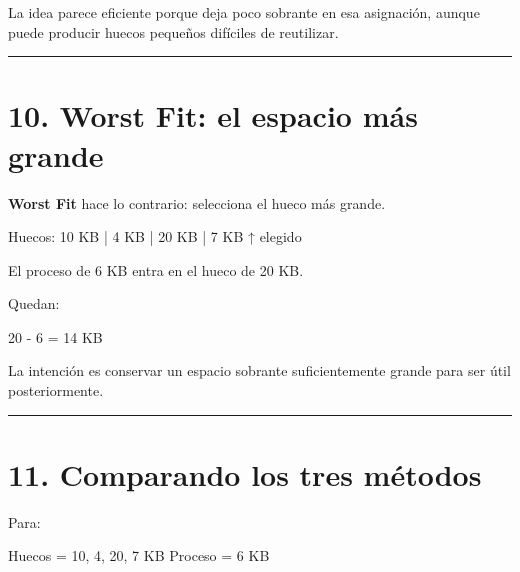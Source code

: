 \documentclass[
  spanish,
  letterpaper,
]{scrbook}
\newenvironment{Shaded}{\begin{snugshade}}{\end{snugshade}}
\newcommand{\NormalTok}[1]{\textcolor[rgb]{0.00,0.23,0.31}{#1}}
\begin{document}
La idea parece eficiente porque deja poco sobrante en esa asignación,
aunque puede producir huecos pequeños difíciles de reutilizar.

\begin{center}\rule{0.5\linewidth}{0.5pt}\end{center}


\chapter{10. Worst Fit: el espacio más
grande}\label{worst-fit-el-espacio-muxe1s-grande}

\textbf{Worst Fit} hace lo contrario: selecciona el hueco más grande.

\begin{Shaded}
\begin{Highlighting}[]
\NormalTok{Huecos: 10 KB | 4 KB | 20 KB | 7 KB}
\NormalTok{                         ↑}
\NormalTok{                      elegido}
\end{Highlighting}
\end{Shaded}

El proceso de 6 KB entra en el hueco de 20 KB.

Quedan:

\begin{Shaded}
\begin{Highlighting}[]
\NormalTok{20 {-} 6 = 14 KB}
\end{Highlighting}
\end{Shaded}

La intención es conservar un espacio sobrante suficientemente grande
para ser útil posteriormente.

\begin{center}\rule{0.5\linewidth}{0.5pt}\end{center}


\chapter{11. Comparando los tres
métodos}\label{comparando-los-tres-muxe9todos}

Para:

\begin{Shaded}
\begin{Highlighting}[]
\NormalTok{Huecos = 10, 4, 20, 7 KB}
\NormalTok{Proceso = 6 KB}
\end{Highlighting}
\end{Shaded}
\end{document}
